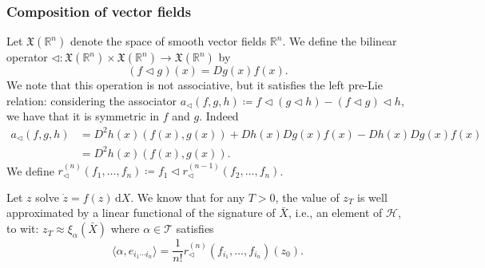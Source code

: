 \documentclass[10pt, reqno]{article}
\theoremstyle{definition}
\theoremstyle{plain}
\newcommand{\R}{\mathbb{R}}
\newcommand{\T}{\mathscr{T}}
\renewcommand{\H}{\mathscr{H}}
\begin{document}
\subsubsection{Composition of vector fields}
Let \(\mathfrak{X}(\R^n)\) denote the space of smooth vector fields \(\R^n\).
We define the bilinear operator
\(\triangleleft\colon\mathfrak{X}(\R^n)\times\mathfrak{X}(\R^n)\to\mathfrak{X}(\R^n)\)
by
\[
	(f\triangleleft g)(x)=Dg(x)f(x).
\]
We note that this operation is not associative, but it satisfies the left pre-Lie relation:
considering the associator
\(a_\triangleleft(f,g,h)\coloneqq f\triangleleft(g\triangleleft h)-(f\triangleleft g)\triangleleft h\),
we have that it is symmetric in \(f\) and \(g\).
Indeed
\begin{align*}
	a_\triangleleft(f,g,h)&= D^2h(x)(f(x),g(x)) + Dh(x)Dg(x)f(x) - Dh(x)Dg(x)f(x)\\
	&= D^2h(x)(f(x),g(x)).
\end{align*}
We define \(r^{(n)}_\triangleleft(f_1,\dotsc,f_n)\coloneqq f_1\triangleleft r^{(n-1)}_\triangleleft(f_2,\dotsc,f_n)\).

Let \(z\) solve \(\dot z=f(z)\,\mathrm dX\).
We know that for any \(T>0\), the value of \(z_T\) is well approximated by a linear functional of the signature of \(\bar{X}\), i.e., an element of
\(\H\), to wit: \( z_T\approx\xi_\alpha(\bar{X}) \) where \(\alpha\in\T\) satisfies
\[
	\langle\alpha, e_{i_1\dotsm i_n}\rangle = \frac{1}{n!}r^{(n)}_\triangleleft(f_{i_1},\dotsc,f_{i_n})(z_0).
\]
\end{document}
